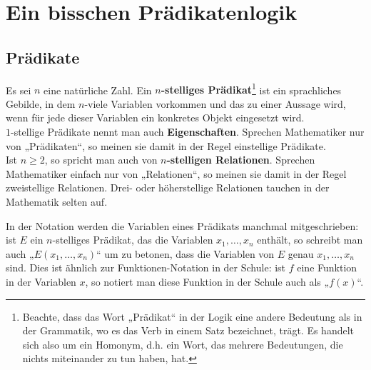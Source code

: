 	
\section{Ein bisschen Prädikatenlogik}









\subsection{Prädikate}
\begin{de}[Prädikat]
 Es sei $n$ eine natürliche Zahl. Ein \textbf{$n$-stelliges Prädikat}\footnote{Beachte, dass das Wort „Prädikat“ in der Logik eine andere Bedeutung als in der Grammatik, wo es das Verb in einem Satz bezeichnet, trägt. Es handelt sich also um ein Homonym, d.h. ein Wort, das mehrere Bedeutungen, die nichts miteinander zu tun haben, hat.} ist ein sprachliches Gebilde, in dem $n$-viele Variablen vorkommen und das zu einer Aussage wird, wenn für jede dieser Variablen ein konkretes Objekt eingesetzt wird. \\
 $1$-stellige Prädikate nennt man auch \textbf{Eigenschaften}. Sprechen Mathematiker nur von „Prädikaten“, so meinen sie damit in der Regel einstellige Prädikate. \\
 Ist $n\geq 2$, so spricht man auch von \textbf{$n$-stelligen Relationen}. Sprechen Mathematiker einfach nur von „Relationen“, so meinen sie damit in der Regel zweistellige Relationen. Drei- oder höherstellige Relationen tauchen in der Mathematik selten auf.
\end{de}


\begin{bem}
In der Notation werden die Variablen eines Prädikats manchmal mitgeschrieben: ist $E$ ein $n$-stelliges Prädikat, das die Variablen $x_1,\dots , x_n$ enthält, so schreibt man auch „$E(x_1,\dots , x_n)$“ um zu betonen, dass die Variablen von $E$ genau $x_1,\dots , x_n$ sind. Dies ist ähnlich zur Funktionen-Notation in der Schule: ist $f$ eine Funktion in der Variablen $x$, so notiert man diese Funktion in der Schule auch als „$f(x)$“.%
\end{bem}


